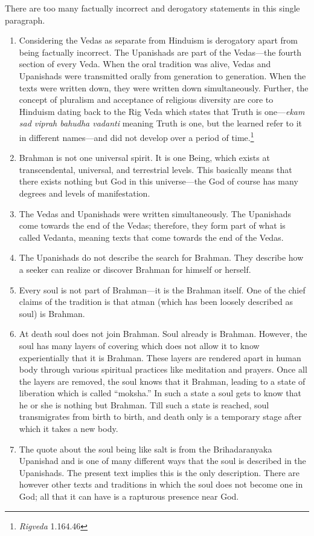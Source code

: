 There are too many factually incorrect and derogatory statements in this single paragraph.
\begin{enumerate}
\item 
Considering the Vedas as separate from Hinduism is derogatory apart from being factually incorrect. The Upanishads are part of the Vedas—the fourth section of every Veda. When the oral tradition was alive, Vedas and Upanishads were transmitted orally from generation to generation. When the texts were written down, they were written down simultaneously. Further, the concept of pluralism and acceptance of religious diversity are core to Hinduism dating back to the Rig Veda which states that Truth is one—\textit{ekam sad viprah bahudha vadanti} meaning Truth is one, but the learned refer to it in different names—and did not develop over a period of time.\footnote{\textit{Rigveda} 1.164.46}
\item 
Brahman is not one universal spirit. It is one Being, which exists at transcendental, universal, and terrestrial levels. This basically means that there exists nothing but God in this universe—the God of course has many degrees and levels of manifestation. 
\item 
The Vedas and Upanishads were written simultaneously. The Upanishads come towards the end of the Vedas; therefore, they form part of what is called Vedanta, meaning texts that come towards the end of the Vedas. 
\item 
The Upanishads do not describe the search for Brahman. They describe how a seeker can realize or discover Brahman for himself or herself. 
\item 
Every soul is not part of Brahman—it is the Brahman itself. One of the chief claims of the tradition is that atman (which has been loosely described as soul) is Brahman. 
\item 
At death soul does not join Brahman. Soul already is Brahman. However, the soul has many layers of covering which does not allow it to know experientially that it is Brahman. These layers are rendered apart in human body through various spiritual practices like meditation and prayers. Once all the layers are removed, the soul knows that it Brahman, leading to a state of liberation which is called “moksha.” In such a state a soul gets to know that he or she is nothing but Brahman. Till such a state is reached, soul transmigrates from birth to birth, and death only is a temporary stage after which it takes a new body.
\item 
The quote about the soul being like salt is from the Brihadaranyaka Upanishad and is one of many different ways that the soul is described in the Upanishads. The present text implies this is the only description. There are however other texts and traditions in which the soul does not become one in God; all that it can have is a rapturous presence near God.

\end{enumerate}
